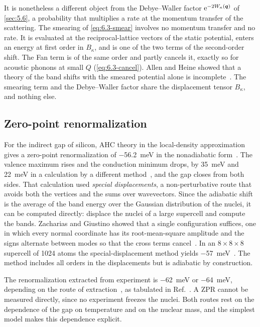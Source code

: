 It is nonetheless a different object from the Debye--Waller factor $\mathrm{e}^{-2W_\kappa(\bm{q})}$ of \cref{sec:5.6}, a probability that multiplies a rate at the momentum transfer of the scattering. The smearing of \cref{eq:6.3-smear} involves no momentum transfer and no rate. It is evaluated at the reciprocal-lattice vectors of the static potential, enters an energy at first order in $B_\kappa$, and is one of the two terms of the second-order shift. The Fan term is of the same order and partly cancels it, exactly so for acoustic phonons at small $Q$ (\cref{eq:6.3-cancel}). Allen and Heine showed that a theory of the band shifts with the smeared potential alone is incomplete~\cite{allen1976theory}. The smearing term and the Debye--Waller factor share the displacement tensor $B_\kappa$, and nothing else.

\subsection{Zero-point renormalization}

For the indirect gap of silicon, AHC theory in the local-density approximation gives a zero-point renormalization of \SI{-56.2}{meV} in the nonadiabatic form~\cite[Table~VI]{ponce2015temperature}. The valence maximum rises and the conduction minimum drops, by \SI{35}{meV} and \SI{22}{meV} in a calculation by a different method~\cite[Sect.~VII\,B]{zacharias2020theory}, and the gap closes from both sides. That calculation used \emph{special displacements}, a non-perturbative route that avoids both the vertices and the sums over wavevectors. Since the adiabatic shift is the average of the band energy over the Gaussian distribution of the nuclei, it can be computed directly: displace the nuclei of a large supercell and compute the bands. Zacharias and Giustino showed that a single configuration suffices, one in which every normal coordinate has its root-mean-square amplitude and the signs alternate between modes so that the cross terms cancel~\cite{zacharias2016one}. In an $8\times8\times8$ supercell of 1024 atoms the special-displacement method yields \SI{-57}{meV}~\cite[Sect.~VII\,B]{zacharias2020theory}. The method includes all orders in the displacements but is adiabatic by construction.

The renormalization extracted from experiment is \SI{-62}{meV} or \SI{-64}{meV}, depending on the route of extraction~\cite{cardona2005electron}, as tabulated in Ref.~\cite[Table~VI]{ponce2015temperature}. A ZPR cannot be measured directly, since no experiment freezes the nuclei. Both routes rest on the dependence of the gap on temperature and on the nuclear mass, and the simplest model makes this dependence explicit.

